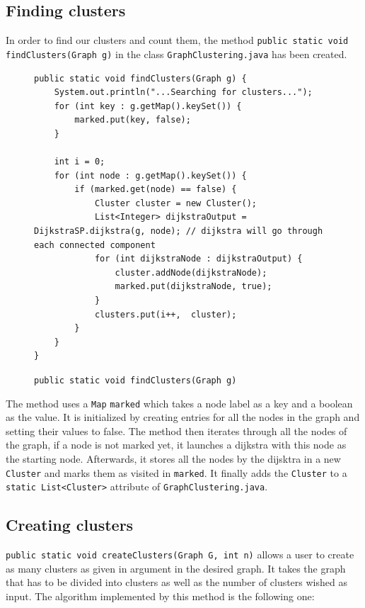 \documentclass{article}
\begin{document}
\subsection{Finding clusters}

In order to find our clusters and count them, the method \texttt{public static void findClusters(Graph g)} in the class \texttt{GraphClustering.java} has been created. 

\begin{figure}[h]
\begin{verbatim}
public static void findClusters(Graph g) {
	System.out.println("...Searching for clusters...");
	for (int key : g.getMap().keySet()) {
		marked.put(key, false);
	}
	
	int i = 0;
	for (int node : g.getMap().keySet()) {
		if (marked.get(node) == false) {
			Cluster cluster = new Cluster();
			List<Integer> dijkstraOutput = DijkstraSP.dijkstra(g, node); // dijkstra will go through each connected component
			for (int dijkstraNode : dijkstraOutput) {
				cluster.addNode(dijkstraNode);
				marked.put(dijkstraNode, true);
			}
			clusters.put(i++,  cluster);
		}
	}
}
\end{verbatim}
\caption{\texttt{public static void findClusters(Graph g)}}
\end{figure}
The method uses a \texttt{Map} \texttt{marked} which takes a node label as a key and a boolean as the value. It is initialized by creating entries for all the nodes in the graph and setting their values to false. The method then iterates through all the nodes of the graph, if a node is not marked yet, it launches a dijkstra with this node as the starting node. Afterwards, it stores all the nodes by the dijsktra in a new \texttt{Cluster} and marks them as visited in \texttt{marked}. It finally adds the \texttt{Cluster} to a \texttt{static List<Cluster>} attribute of \texttt{GraphClustering.java}.

\newpage

\subsection{Creating clusters}

\texttt{public static void createClusters(Graph G, int n)} allows a user to create as many clusters as given in argument in the desired graph. It takes the graph that has to be divided into clusters as well as the number of clusters wished as input.
The algorithm implemented by this method is the following one:
\end{document}
